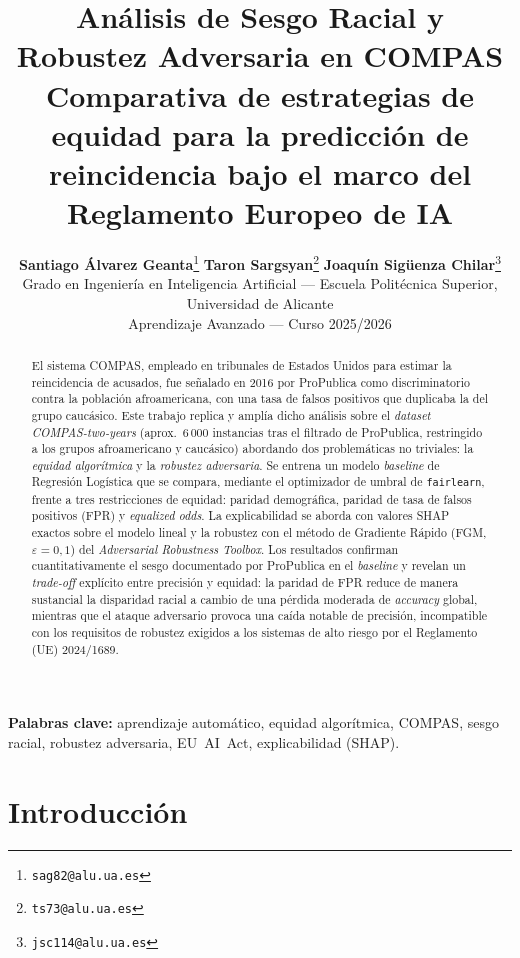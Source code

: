 \documentclass[11pt,a4paper]{article}
\title{
    \textbf{Análisis de Sesgo Racial y Robustez Adversaria en COMPAS}\\[4pt]
    \large Comparativa de estrategias de equidad para la predicción de reincidencia bajo el marco del Reglamento Europeo de IA
}
\author{
    \textbf{Santiago Álvarez Geanta}\thanks{\texttt{sag82@alu.ua.es}}
    \quad
    \textbf{Taron Sargsyan}\thanks{\texttt{ts73@alu.ua.es}}
    \quad
    \textbf{Joaquín Sigüenza Chilar}\thanks{\texttt{jsc114@alu.ua.es}}
    \\[4pt]
    \small Grado en Ingeniería en Inteligencia Artificial
    --- Escuela Politécnica Superior, Universidad de Alicante\\
    \small Aprendizaje Avanzado --- Curso 2025/2026
}
\date{}
\begin{document}
\maketitle
\thispagestyle{empty}


\begin{abstract}
\noindent El sistema COMPAS, empleado en tribunales de Estados Unidos para estimar la reincidencia de acusados, fue señalado en 2016 por ProPublica como discriminatorio contra la población afroamericana, con una tasa de falsos positivos que duplicaba la del grupo caucásico. Este trabajo replica y amplía dicho análisis sobre el \textit{dataset} \textit{COMPAS-two-years} (aprox.\ 6\,000 instancias tras el filtrado de ProPublica, restringido a los grupos afroamericano y caucásico) abordando dos problemáticas no triviales: la \textit{equidad algorítmica} y la \textit{robustez adversaria}. Se entrena un modelo \textit{baseline} de Regresión Logística que se compara, mediante el optimizador de umbral de \texttt{fairlearn}, frente a tres restricciones de equidad: paridad demográfica, paridad de tasa de falsos positivos (FPR) y \textit{equalized odds}. La explicabilidad se aborda con valores SHAP exactos sobre el modelo lineal y la robustez con el método de Gradiente Rápido (FGM, $\varepsilon{=}0{,}1$) del \textit{Adversarial Robustness Toolbox}. Los resultados confirman cuantitativamente el sesgo documentado por ProPublica en el \textit{baseline} y revelan un \textit{trade-off} explícito entre precisión y equidad: la paridad de FPR reduce de manera sustancial la disparidad racial a cambio de una pérdida moderada de \textit{accuracy} global, mientras que el ataque adversario provoca una caída notable de precisión, incompatible con los requisitos de robustez exigidos a los sistemas de alto riesgo por el Reglamento (UE) 2024/1689.
\end{abstract}

\smallskip
\noindent\textbf{Palabras clave:} aprendizaje automático, equidad algorítmica, COMPAS, sesgo racial, robustez adversaria, EU~AI~Act, explicabilidad (SHAP).

\tableofcontents
\newpage


\section{Introducción}
\end{document}
